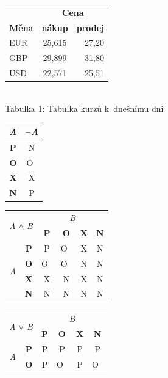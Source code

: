 \documentclass[a4paper,11pt]{article}
\begin{document}
{  \begin{center}
  \begin{tabular}{|l|c|r|}
    \hline
      & \multicolumn{2}{c|}{\textbf{Cena}} \\ \cline{2-3}
    \textbf{Měna} & \textbf{nákup} & \textbf{prodej} \\ \hline
    EUR & 25,615 & 27,20 \\
    GBP & 29,899 & 31,80 \\
    USD & 22,571 & 25,51 \\
    \hline
  \end{tabular} \\ \medskip
  Tabulka 1: Tabulka kurzů k~dnešnímu dni\bigskip\bigskip\bigskip

  \begin{tabular}{|c|c|}
    \hline
    \emph{A} & $\neg$\emph{A} \\ \hline
    \textbf{P} & N \\ \hline
    \textbf{O} & O~\\ \hline
    \textbf{X} & X \\ \hline
    \textbf{N} & P \\
    \hline
  \end{tabular}
  \begin{tabular}{|c|c|c|c|c|c|}
    \hline
    \multicolumn{2}{|c|}{\multirow{2}{*}{\emph{A} $\wedge$ \emph{B}}} & \multicolumn{4}{c|}{\emph{B}} \\ \cline{3-6}
     \multicolumn{2}{|c|}{} & \textbf{P} & \textbf{O} & \textbf{X} & \textbf{N} \\ \hline
    \multirow{4}{*}{\emph{A}} & \textbf{P} & P & O~& X & N \\ \cline{2-6}
      & \textbf{O} & O~& O~& N & N \\ \cline{2-6}
      & \textbf{X} & X & N & X & N \\ \cline{2-6}
      & \textbf{N} & N & N & N & N \\
    \hline
  \end{tabular}
  \begin{tabular}{|c|c|c|c|c|c|}
    \hline
    \multicolumn{2}{|c|}{\multirow{2}{*}{\emph{A} $\vee$ \emph{B}}} & \multicolumn{4}{c|}{\emph{B}} \\ \cline{3-6}
      \multicolumn{2}{|c|}{}     & \textbf{P} & \textbf{O} & \textbf{X} & \textbf{N} \\ \hline
    \multirow{4}{*}{\emph{A}} & \textbf{P} & P & P & P & P \\ \cline{2-6}
      & \textbf{O} & P & O~& P & O~\\ \cline{2-6}

\end{tabular}
\end{center}}
\end{document}
